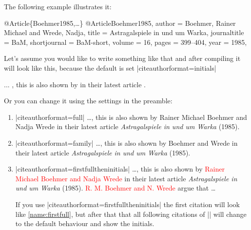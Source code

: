 \documentclass[a4paper,
10pt,
greek,
french,
spanish,
italian,
ngerman,
english,
]{ltxdoc}
\begin{document}
The following example illustrates it:

\begin{bibexample}[label=Boehmer1985]{{@}Article\{Boehmer1985,…\}}
@Article{Boehmer1985,
  author       = {Boehmer, Rainer Michael and Wrede, Nadja},
  title        = {Astragalspiele in und um Warka},
  journaltitle = BaM,
  shortjournal = BaM-short,
  volume       = {16},
  pages        = {399--404},
  year         = {1985},
}
\end{bibexample}

Let's assume you would like to write something like that and
after compiling it will look like this, 
because the default is set  |citeauthorformat=initials| 

\begin{refsection}
\begin{example}
... , this is also shown by \citeauthor{Boehmer1985} 
 in their latest article .
 \end{example}



Or you can change it using the settings in the preamble:

\begin{enumerate}
\item\label{name:full} 
\begin{tcolorbox}[examplebox]
 |citeauthorformat=full| 
 \tcblower
\ldots , this is also shown by {\color{red}Rainer Michael Boehmer and Nadja Wrede} in their latest article \emph{Astragalspiele in und um Warka} (1985).
\end{tcolorbox}
\item\label{name:family}
\begin{tcolorbox}[examplebox]
 |citeauthorformat=family| 
 \tcblower
\ldots , this is also shown by {\color{red}Boehmer and  Wrede} in their latest article \emph{Astragalspiele in und um Warka} (1985).
\end{tcolorbox}
\item\label{name:firstfulltheninitials}
\begin{tcolorbox}[examplebox]
 |citeauthorformat=firstfulltheninitials|
 \tcblower
\ldots , this is also shown by \textcolor{red}{Rainer Michael Boehmer  and Nadja Wrede} in their latest article \emph{Astragalspiele in und um Warka} (1985). 
\textcolor{red}{R. M. Boehmer  and N. Wrede} argue that \ldots
\end{tcolorbox}
  If you use |citeauthorformat=firstfulltheninitials| the first citation will look like \ref{name:firstfull}, but after that that all following citations of |\citeauthor{Boehmer1985}| will change to the default behaviour and show the initials.
  

\end{enumerate}
\end{refsection}
\end{document}
